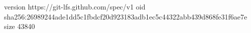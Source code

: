 version https://git-lfs.github.com/spec/v1
oid sha256:26989244ade1dd5c1fbdcf20d923183adb1ec5c44322abb439d868fe31f6ae7e
size 43840
